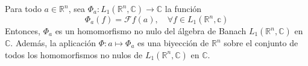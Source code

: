 \documentclass[12pt]{report}
\theoremstyle{largebreak}
\newcommand\cf[3]{\ensuremath{#1:#2\rightarrow#3}}
\newcommand{\fou}[1]{\ensuremath{\mathcal{F}#1}}
\begin{document}
    \begin{theor}
        Para todo $a\in\mathbb{R}^n$, sea $\cf{\Phi_a}{L_1(\mathbb{R}^n,\mathbb{C})}{\mathbb{C}}$ la función
        \begin{equation*}
            \Phi_a(f)=\fou{f}(a),\quad\forall f\in L_1(\mathbb{R}^n,\mathbb{c})
        \end{equation*}
        Entonces, $\Phi_a$ es un homomorfismo no nulo del álgebra de Banach $L_1(\mathbb{R}^n,\mathbb{C})$ en $\mathbb{C}$. Además, la aplicación $\Phi:a\mapsto \Phi_a$ es una biyección de $\mathbb{R}^n$ sobre el conjunto de todos los homomorfismos no nulos de $L_1(\mathbb{R}^n,\mathbb{C})$ en $\mathbb{C}$.
    \end{theor}
\end{document}
